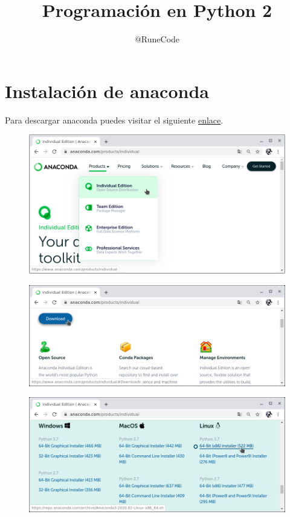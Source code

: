 \documentclass{article}
\title{Programación en Python 2}
\author{@RuneCode}
\begin{document}


\section{Instalación de anaconda}%

Para descargar anaconda puedes visitar el siguiente
\href{https://www.anaconda.com/}{enlace}.

\begin{figure}[h!]
  \centering
  \includegraphics[scale=0.75]{./Pictures/001_install_anaconda.png}
\end{figure}

\begin{figure}[h!]
  \centering
  \includegraphics[scale=0.75]{./Pictures/001_download_anaconda.png}
\end{figure}

\newpage

\begin{figure}[h!]
  \centering
  \includegraphics[scale=0.75]{./Pictures/002_download_anaconda.png}
\end{figure}
\end{document}
